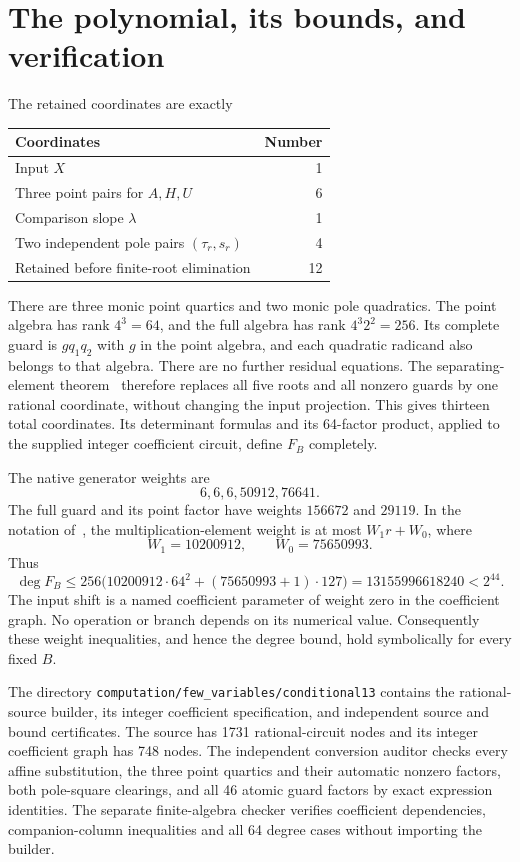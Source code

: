 \documentclass[11pt,a4paper]{article}
\begin{document}
\section{The polynomial, its bounds, and verification}

The retained coordinates are exactly
\begin{center}
\begin{tabular}{lr}
\toprule
Coordinates & Number\\
\midrule
Input $X$ & 1\\
Three point pairs for $A,H,U$ & 6\\
Comparison slope $\lambda$ & 1\\
Two independent pole pairs $(\tau_r,s_r)$ & 4\\
\midrule
Retained before finite-root elimination & 12\\
\bottomrule
\end{tabular}
\end{center}
There are three monic point quartics and two monic pole quadratics.
The point algebra has rank $4^3=64$, and the full algebra has
rank $4^3 2^2=256$. Its complete guard is $gq_1q_2$ with
$g$ in the point algebra, and each quadratic radicand also belongs
to that algebra. There are no further residual equations.
The separating-element theorem~\cite{Active} therefore replaces
all five roots and all nonzero guards by one rational coordinate,
without changing the input projection. This gives thirteen total
coordinates. Its determinant formulas and its 64-factor product,
applied to the supplied integer coefficient circuit, define $F_B$
completely.

The native generator weights are
\[
                         6,6,6,50912,76641.
\]
The full guard and its point factor have weights $156672$ and
$29119$. In the notation of~\cite[Theorem~4.1]{Active},
the multiplication-element weight is at most $W_1r+W_0$, where
\[
                    W_1=10200912,\qquad W_0=75650993.
\]
Thus
\[
 \deg F_B\le256\bigl(10200912\cdot64^2
                         +(75650993+1)\cdot127\bigr)
             =13155996618240<2^{44}.
\]
The input shift is a named coefficient parameter of weight zero
in the coefficient graph. No operation or branch depends on its
numerical value. Consequently these weight inequalities, and hence
the degree bound, hold symbolically for every fixed $B$.

The directory \nolinkurl{computation/few_variables/conditional13}
contains the rational-source builder, its integer coefficient
specification, and independent source and bound certificates.
The source has 1731 rational-circuit nodes and its integer
coefficient graph has 748 nodes. The independent conversion auditor
checks every affine substitution, the three point quartics and
their automatic nonzero factors, both pole-square clearings,
and all 46 atomic guard factors by exact expression identities.
The separate finite-algebra checker verifies coefficient dependencies,
companion-column inequalities and all 64 degree cases without
importing the builder.
\end{document}
